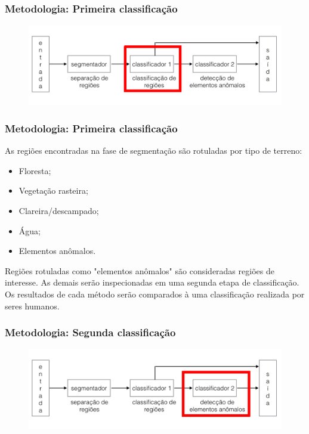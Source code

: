 \documentclass[t]{beamer}
\begin{document}
\begin{frame}[c]
	\frametitle{Metodologia: Primeira classificação}
	\begin{figure}[h]
    	\includegraphics[width=\textwidth]{imgs/arquitetura_2}
	\end{figure}
\end{frame}

\begin{frame}
	\frametitle{Metodologia: Primeira classificação}

	As regiões encontradas na fase de segmentação são rotuladas por tipo de terreno:

	\begin{itemize}
		\item Floresta;
		\item Vegetação rasteira;
		\item Clareira/descampado;
		\item Água;
		\item Elementos anômalos.
	\end{itemize}

	Regiões rotuladas como "elementos anômalos" são consideradas regiões de interesse. As demais serão inspecionadas em uma segunda etapa de classificação. Os resultados de cada método serão comparados à uma classificação realizada por seres humanos.

\end{frame}

\begin{frame}[c]
	\frametitle{Metodologia: Segunda classificação}
	\begin{figure}[h]
    	\includegraphics[width=\textwidth]{imgs/arquitetura_3}
	\end{figure}
\end{frame}
\end{document}
